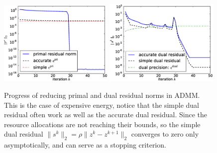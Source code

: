\begin{figure}[th]
\centering
\includegraphics[width=0.49\textwidth]{figures/test_primal_e.eps}
\includegraphics[width=0.49\textwidth]{figures/test_dual_e.eps}
\caption{Progress of reducing primal and dual residual norms in ADMM.
    This is the case of expensive energy, notice that the simple dual
residual often work as well as the accurate dual residual. Since
the resource allocations are not reaching their bounds, so the simple
dual residual $\|s^k\|_2=\rho\|z^{k}-z^{k+1}\|_2$ converges to zero 
only asymptotically, and can serve as a stopping criterion.}
\label{fig:residual-e}
\end{figure}

